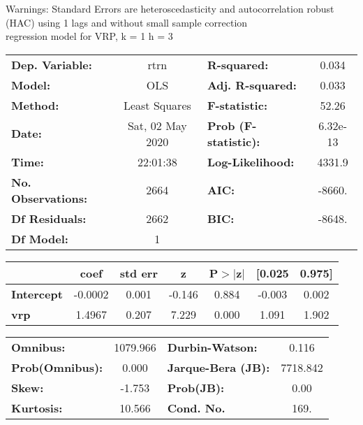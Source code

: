 Warnings: \newline
 [1] Standard Errors are heteroscedasticity and autocorrelation robust (HAC) using 1 lags and without small sample correction\\ 

regression model for VRP, k = 1 h = 3\begin{center}
\begin{tabular}{lclc}
\toprule
\textbf{Dep. Variable:}    &       rtrn       & \textbf{  R-squared:         } &     0.034   \\
\textbf{Model:}            &       OLS        & \textbf{  Adj. R-squared:    } &     0.033   \\
\textbf{Method:}           &  Least Squares   & \textbf{  F-statistic:       } &     52.26   \\
\textbf{Date:}             & Sat, 02 May 2020 & \textbf{  Prob (F-statistic):} &  6.32e-13   \\
\textbf{Time:}             &     22:01:38     & \textbf{  Log-Likelihood:    } &    4331.9   \\
\textbf{No. Observations:} &        2664      & \textbf{  AIC:               } &    -8660.   \\
\textbf{Df Residuals:}     &        2662      & \textbf{  BIC:               } &    -8648.   \\
\textbf{Df Model:}         &           1      & \textbf{                     } &             \\
\bottomrule
\end{tabular}
\begin{tabular}{lcccccc}
                   & \textbf{coef} & \textbf{std err} & \textbf{z} & \textbf{P$> |$z$|$} & \textbf{[0.025} & \textbf{0.975]}  \\
\midrule
\textbf{Intercept} &      -0.0002  &        0.001     &    -0.146  &         0.884        &       -0.003    &        0.002     \\
\textbf{vrp}       &       1.4967  &        0.207     &     7.229  &         0.000        &        1.091    &        1.902     \\
\bottomrule
\end{tabular}
\begin{tabular}{lclc}
\textbf{Omnibus:}       & 1079.966 & \textbf{  Durbin-Watson:     } &    0.116  \\
\textbf{Prob(Omnibus):} &   0.000  & \textbf{  Jarque-Bera (JB):  } & 7718.842  \\
\textbf{Skew:}          &  -1.753  & \textbf{  Prob(JB):          } &     0.00  \\
\textbf{Kurtosis:}      &  10.566  & \textbf{  Cond. No.          } &     169.  \\
\bottomrule
\end{tabular}
\end{center}

